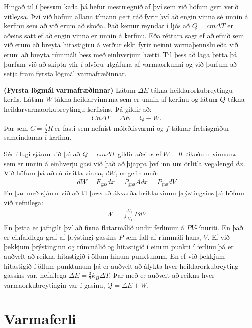 \ifdefined \wholebook \else\documentclass[oneside]{book}\usepackage{EdlBook}\graphicspath{{figures/}}
\begin{document}
Hingað til í þessum kafla þá hefur mestmegnið af því sem við höfum gert verið vitleysa. Því við höfum allann tímann gert ráð fyrir því að engin vinna sé unnin á kerfinu sem að við erum að skoða. Það kemur reyndar í ljós að $Q = cm\Delta T$ er aðeins satt ef að engin vinna er unnin á kerfinu. Eða réttara sagt ef að efnið sem við erum að breyta hitastiginu á verður ekki fyrir neinni varmaþennslu eða við erum að breyta rúmmáli þess með einhverjum hætti. Til þess að laga þetta þá þurfum við að skipta yfir í alvöru útgáfuna af varmaorkunni og við þurfum að setja fram fyrsta lögmál varmafræðinnar.
\begin{tcolorbox}
\begin{theorem}
\textbf{(Fyrsta lögmál varmafræðinnar)} Látum $\Delta E$ tákna heildarorkubreytingu kerfis. Látum $W$ tákna heildarvinnuna sem er unnin af kerfinu og látum $Q$ tákna heildarvarmaorkubreytingu kerfisins. Þá gildir að:
\begin{align*}
    C n \Delta T = \Delta E = Q - W.
\end{align*}
Þar sem $C = \frac{f}{2}R$ er fasti sem nefnist móleðlisvarmi og $f$ táknar frelsisgráður sameindanna í kerfinu.
\end{theorem}
\end{tcolorbox}

Sér í lagi sjáum við þá að $Q = cm\Delta T$ gildir aðeins ef $W = 0$. Skoðum vinnuna sem er unnin á einhverju gasi við það að þjappa því inn um örlitla vegalengd $dx$. Við höfum þá að sú örlitla vinna, $dW$, er gefin með:
\begin{align*}
    dW = F_{\text{gas}} dx = P_{\text{gas}}A dx = P_{\text{gas}} dV
\end{align*}
En þar með sjáum við að til þess að ákvarða heildarvinnu þrýstingsins þá höfum við nefnilega:
\begin{align*}
    W = \int_{V_1}^{V_2} PdV
\end{align*}
En þetta er jafngilt því að finna flatarmálið undir ferlinum á $PV$-línuriti. En það er einfaldlega graf af þrýstingi gassins $P$ sem fall af rúmmáli hans, $V$. Ef við þekkjum þrýstinginn og rúmmálið og hitastigið í einum punkti í ferlinu þá er auðvelt að reikna hitastigið í öllum hinum punktunum. En ef við þekkjum hitastigið í öllum punktunum þá er auðvelt að álykta hver heildarorkubreyting gassins var, nefnilega $\Delta E = \frac{3}{2}k_B\Delta T$. Þar með er auðvelt að reikna hver varmaorkubreytingin var í gasinu, $Q = \Delta E + W$.


\section{Varmaferli}
\end{document}
